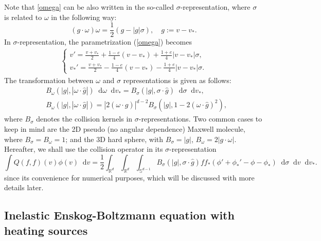 \documentclass[review, times]{elsarticle}
\newcommand*\diff{\mathop{}\!\mathrm{d}}
\begin{document}
Note that \eqref{omega} can be also written in the so-called $\sigma$-representation, where $\sigma$ is related to $\omega$ in the following way:
\begin{equation} \label{relation}
(g\cdot \omega)\omega =\frac{1}{2}(g-|g|\sigma), \quad g:=v-v_*.
\end{equation}
In $\sigma$-representation, the parametrization (\ref{omega}) becomes
\begin{align*} 
\left\{
\begin{array}{l}
\displaystyle v'=\frac{v+v_*}{2}+\frac{1-e}{4}(v-v_*)+\frac{1+e}{4}|v-v_*|\sigma, \\[8pt]
\displaystyle v_*'=\frac{v+v_*}{2}- \frac{1-e}{4}(v-v_*)-\frac{1+e}{4}|v-v_*|\sigma.
\end{array}\right.
\end{align*}
The transformation between $\omega$ and $\sigma$ representations is given as follows:
\begin{align*}
& B_{\omega}(|g|, |\omega\cdot \hat{g}|) \diff{\omega} \diff{v_*}  = B_{\sigma}(|g|,\sigma\cdot \hat{g})\diff{\sigma} \diff{v_*}  , \\
& B_{\omega}(|g|, |\omega\cdot \hat{g}|) =|2(\omega\cdot \hat{g})|^{d-2}B_{\sigma}(|g|,1-2(\omega\cdot\hat{g})^2),
\end{align*}
where $B_\sigma$ denotes the collision kernels in $\sigma$-representations. Two common cases to keep in mind are the 2D pseudo (no angular dependence) Maxwell molecule, where $B_{\sigma}=B_{\omega}=1$; and the 3D hard sphere, with $B_{\sigma}=|g|$, $B_{\omega}=2|g\cdot\omega|$. Hereafter, we shall use the collision operator in its $\sigma$-representation
\begin{equation} \label{col_sigma}
\int Q(f,f)(v)\phi(v)\diff{v}= \frac{1}{2} \int_{\mathbb{R}^d} \int_{\mathbb{R}^d} \int_{\mathbb{S}^{d-1}}
B_{\sigma}(|g|,\sigma\cdot \hat{g})ff_*\left(\phi'+\phi_*'-\phi-\phi_* \right)\diff{\sigma}\diff{v}\diff{v_*}.
\end{equation}
since its convenience for numerical purposes, which will be discussed with more details later.

\subsection{Inelastic Enskog-Boltzmann equation with heating sources}
\end{document}
